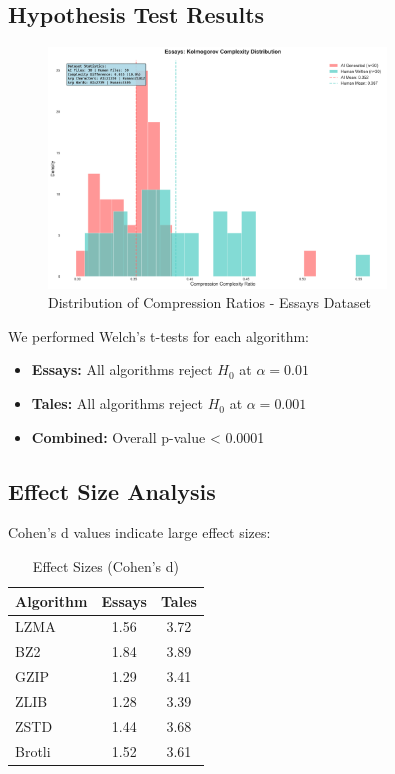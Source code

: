 \documentclass[12pt,a4paper]{report}
\begin{document}
\subsection{Hypothesis Test Results}

\begin{figure}[h]
\centering
\includegraphics[width=0.8\textwidth]{figures/essays_visualizations/01_distribution_comparison.png}
\caption{Distribution of Compression Ratios - Essays Dataset}
\label{fig:essay_distribution}
\end{figure}

We performed Welch's t-tests for each algorithm:

\begin{itemize}
    \item \textbf{Essays:} All algorithms reject $H_0$ at $\alpha = 0.01$
    \item \textbf{Tales:} All algorithms reject $H_0$ at $\alpha = 0.001$
    \item \textbf{Combined:} Overall p-value < 0.0001
\end{itemize}

\subsection{Effect Size Analysis}

Cohen's d values indicate large effect sizes:

\begin{table}[h]
\centering
\caption{Effect Sizes (Cohen's d)}
\begin{tabular}{lcc}
\toprule
\textbf{Algorithm} & \textbf{Essays} & \textbf{Tales} \\
\midrule
LZMA & 1.56 & 3.72 \\
BZ2 & 1.84 & 3.89 \\
GZIP & 1.29 & 3.41 \\
ZLIB & 1.28 & 3.39 \\
ZSTD & 1.44 & 3.68 \\
Brotli & 1.52 & 3.61 \\
\bottomrule
\end{tabular}
\end{table}
\end{document}
